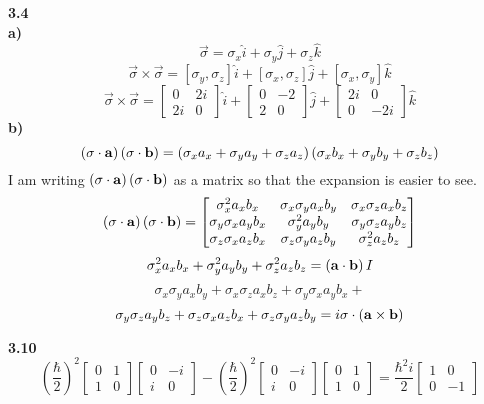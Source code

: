 \documentclass[english]{article}
\begin{document}
\begin{multicols*}{2}
\noindent
\textbf{3.4}\\
\textbf{a)} $$\vec{\sigma}=\sigma_x\hat{i}+\sigma_y\hat{j}+\sigma_z\hat{k}$$
$$\vec{\sigma}\times\vec{\sigma}=\left[\sigma_y, \sigma_z\right]\hat{i}+\left[\sigma_x, \sigma_z\right]\hat{j}+\left[\sigma_x, \sigma_y\right]\hat{k}$$
\[
\vec{\sigma}\times\vec{\sigma}=
\begin{bmatrix}
0&2i\\
2i&0
\end{bmatrix}
\hat{i}+
\begin{bmatrix}
0&-2\\
2&0
\end{bmatrix}
\hat{j}+
\begin{bmatrix}
2i&0\\
0&-2i
\end{bmatrix}
\hat{k}
\]
\textbf{b)} $$\left(\vb{\sigma}\cdot \vb{a}\right)\left(\vb{\sigma}\cdot \vb{b}\right)=\left(\sigma_x a_x+\sigma_y a_y+\sigma_z a_z\right)\left(\sigma_x b_x+\sigma_y b_y+\sigma_z b_z\right)$$
I am writing $\left(\vb{\sigma}\cdot \vb{a}\right)\left(\vb{\sigma}\cdot \vb{b}\right)$ as a matrix so that the expansion is easier to see.
\[
\left(\vb{\sigma}\cdot \vb{a}\right)\left(\vb{\sigma}\cdot \vb{b}\right)=
\begin{bmatrix}
\sigma_x^2 a_x b_x & \sigma_x\sigma_y a_x b_y & \sigma_x\sigma_z a_x b_z\\
\sigma_y\sigma_x a_y b_x & \sigma_y^2 a_y b_y & \sigma_y\sigma_z a_y b_z\\
\sigma_z\sigma_x a_z b_x & \sigma_z\sigma_y a_z b_y & \sigma_z^2 a_z b_z
\end{bmatrix}
\]
$$\sigma_x^2 a_x b_x+\sigma_y^2 a_y b_y+\sigma_z^2 a_z b_z=\left(\vb{a}\cdot\vb{b}\right)I$$
$$\sigma_x\sigma_y a_x b_y + \sigma_x\sigma_z a_x b_z+\sigma_y\sigma_x a_y b_x+$$$$\sigma_y\sigma_z a_y b_z+\sigma_z\sigma_x a_z b_x + \sigma_z\sigma_y a_z b_y=i\vb{\sigma}\cdot\left(\vb{a}\times \vb{b}\right)$$

\noindent
\textbf{3.10}\\
\[
\left(\frac{\hbar}{2}\right)^2
\begin{bmatrix}
0&1\\
1&0
\end{bmatrix}
\begin{bmatrix}
0&-i\\
i&0
\end{bmatrix}
-
\left(\frac{\hbar}{2}\right)^2
\begin{bmatrix}
0&-i\\
i&0
\end{bmatrix}
\begin{bmatrix}
0&1\\
1&0
\end{bmatrix}
=
\frac{\hbar^2i}{2}
\begin{bmatrix}
1&0\\
0&-1
\end{bmatrix}
\]


\end{multicols*}
\end{document}
